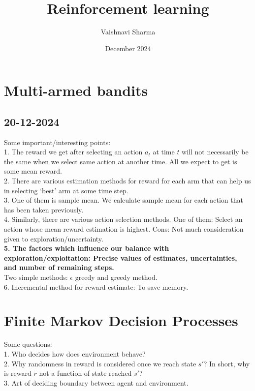 \documentclass{article}
\title{Reinforcement learning}
\author{Vaishnavi Sharma}
\date{December 2024}
\begin{document}
\maketitle

\section{Multi-armed bandits}
\subsection{20-12-2024}
Some important/interesting points:\\
1. The reward we get after selecting an action $a_{t}$ at time $t$ will not necessarily be the same when we select same action at another time. All we expect to get is some mean reward. \\
2. There are various estimation methods for reward for each arm that can help us in selecting `best' arm at some time step.\\
3. One of them is sample mean. We calculate sample mean for each action that has been taken previously.\\
4. Similarly, there are various action selection methods. One of them: Select an action whose mean reward estimation is highest. Cons: Not much consideration given to exploration/uncertainty.\\
\textbf{5. The factors which influence our balance with exploration/exploitation: Precise values of estimates, uncertainties, and number of remaining steps.}\\

Two simple methods: $\epsilon$ greedy and greedy method.\\
6. Incremental method for reward estimate: To save memory.

\section{Finite Markov Decision Processes}
Some questions:\\
1. Who decides how does environment behave?\\
2. Why randomness in reward is considered once we reach state $s'$? In short, why is reward $r$ not a function of state reached $s'$?\\
3. Art of deciding boundary between agent and environment.
\end{document}
